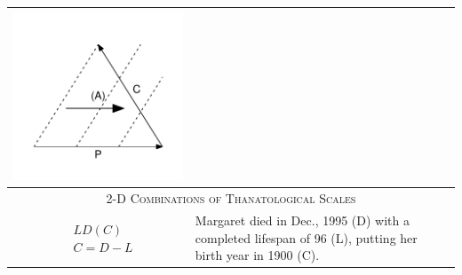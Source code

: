 \documentclass[11pt,oneside,a4paper]{article} %
\begin{document}
\begin{center}
\begin{longtable}{m{}m{}m{}m{}}
  \includegraphics[width = \linewidth]{Figures/JonasTable/CPa_iso.pdf}  \\
  \midrule
  \multicolumn{4}{c}{\textsc{2-D Combinations of Thanatological Scales}} \\
  \midrule
  $$\begin{aligned}
    &LD(C) \\
    &C = D - L
  \end{aligned}$$ &
  Margaret died in Dec., 1995 (D) with a completed lifespan of 96 (L), putting
  her birth year in 1900 (C). &

\end{longtable}
\end{center}
\end{document}
